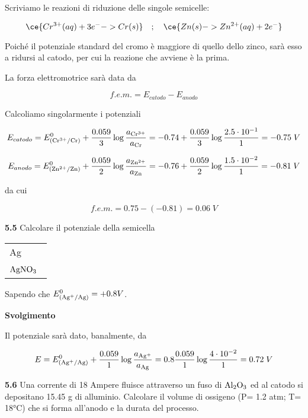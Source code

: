 \vspace{0.2cm}Scriviamo le reazioni di riduzione delle singole semicelle:

$$\ce{Cr^{3+}(aq) + 3 e^- -> Cr(s)}
\quad;\quad
\ce{Zn(s) -> Zn^{2+}(aq) + 2 e^-}$$

Poiché il potenziale standard del cromo è maggiore di quello dello zinco, sarà esso a ridursi al catodo, per cui la reazione che avviene è la prima.

La forza elettromotrice sarà data da

$$f.e.m. = E_{catodo} - E_{anodo}$$

Calcoliamo singolarmente i potenziali

$$E_{catodo}
=E^0_{(\rm Cr^{3+}/Cr)} + \frac{0.059}{3} \log \frac{a_{\rm Cr^{3+}}}{a_{\rm Cr}}
=-0.74 + \frac{0.059}{3} \log \frac{2.5 \cdot 10^{-1}}{1}
=-0.75\;V$$

$$E_{anodo} = E^0_{(\rm Zn^{2+}/Zn)} + \frac{0.059}{2} \log \frac{a_{\rm Zn^{2+}}}{a_{\rm Zn}}
=-0.76 + \frac{0.059}{2} \log \frac{1.5 \cdot 10^{-2}}{1}
=-0.81\;V$$

da cui

$$f.e.m.=0.75 - (-0.81) = 0.06\;V$$

\vspace{0.2cm}\textbf{5.5} Calcolare il potenziale della semicella 

\begin{center}
    \begin{tabular}{|p{3.7cm}|}
         Ag\\[0.5ex]
         $\rm AgNO_3$ \, \\[0.5ex]
    \end{tabular}
\end{center}

Sapendo che $E^{0}_{(\rm Ag^{+}/Ag)}=+0.8V$.

\vspace{0.2cm}\large\textbf{Svolgimento}\normalsize

\vspace{0.2cm}Il potenziale sarà dato, banalmente, da

$$E = E^0_{(\rm Ag^{+}/Ag)} + \frac{0.059}{1} \log \frac{a_{\rm Ag^{+}}}{a_{\rm Ag}}
=0.8 \frac{0.059}{1} \log \frac{4 \cdot 10^{-2}}{1}
=0.72\;V$$

\vspace{0.2cm}\textbf{5.6} Una corrente di 18 Ampere fluisce attraverso un fuso di $\rm Al_2O_3$ ed al catodo si depositano 15.45 g di alluminio. Calcolare il volume di ossigeno (P= 1.2 atm; T= 18°C) che si forma all'anodo e la
durata del processo.

